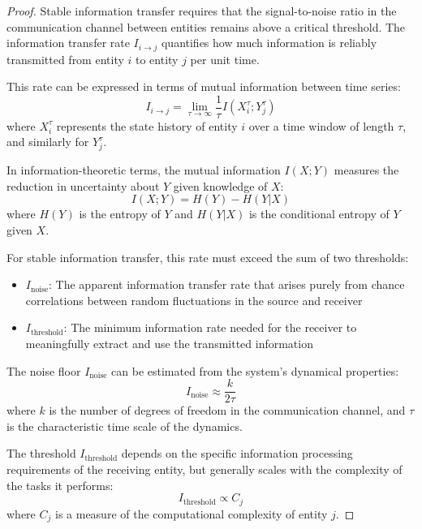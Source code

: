 \begin{proof}
Stable information transfer requires that the signal-to-noise ratio in the communication channel between entities remains above a critical threshold. The information transfer rate $I_{i \to j}$ quantifies how much information is reliably transmitted from entity $i$ to entity $j$ per unit time.

This rate can be expressed in terms of mutual information between time series:
\begin{equation}
I_{i \to j} = \lim_{\tau \to \infty} \frac{1}{\tau} I(X_i^{\tau}; Y_j^{\tau})
\end{equation}
where $X_i^{\tau}$ represents the state history of entity $i$ over a time window of length $\tau$, and similarly for $Y_j^{\tau}$.

In information-theoretic terms, the mutual information $I(X; Y)$ measures the reduction in uncertainty about $Y$ given knowledge of $X$:
\begin{equation}
I(X; Y) = H(Y) - H(Y|X)
\end{equation}
where $H(Y)$ is the entropy of $Y$ and $H(Y|X)$ is the conditional entropy of $Y$ given $X$.

For stable information transfer, this rate must exceed the sum of two thresholds:
\begin{itemize}
    \item $I_{\text{noise}}$: The apparent information transfer rate that arises purely from chance correlations between random fluctuations in the source and receiver
    \item $I_{\text{threshold}}$: The minimum information rate needed for the receiver to meaningfully extract and use the transmitted information
\end{itemize}

The noise floor $I_{\text{noise}}$ can be estimated from the system's dynamical properties:
\begin{equation}
I_{\text{noise}} \approx \frac{k}{2\tau}
\end{equation}
where $k$ is the number of degrees of freedom in the communication channel, and $\tau$ is the characteristic time scale of the dynamics.

The threshold $I_{\text{threshold}}$ depends on the specific information processing requirements of the receiving entity, but generally scales with the complexity of the tasks it performs:
\begin{equation}
I_{\text{threshold}} \propto C_j
\end{equation}
where $C_j$ is a measure of the computational complexity of entity $j$.


\end{proof}
